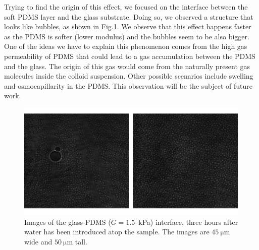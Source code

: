 Trying to find the origin of this effect, we focused on the interface between the soft PDMS layer and the glass substrate. Doing so, we observed a structure that looks like bubbles, as shown in Fig.\ref{fig.bubbles}. We observe that this effect happens faster as the PDMS is softer (lower modulus) and the bubbles seem to be also bigger. One of the ideas we have to explain this phenomenon comes from the high gas permeability of PDMS that could lead to a gas accumulation between the PDMS and the glass. The origin of this gas would come from the naturally present gas molecules inside the colloid suspension. Other possible scenarios include swelling and osmocapillarity in the PDMS. This observation will be the subject of future work. 


\begin{figure}[h]
	\centering
	\includegraphics{02_body/chapter4/images/ageing/bullbles_1p5kpa_3hours.pdf}
	\caption{Images of the glass-PDMS ($G=1.5$~kPa) interface, three hours after water has been introduced atop the sample. The images are $45~\mathrm{\mu m}$ wide and $50~\mathrm{\mu m}$ tall.}
	\label{fig.bubbles}
\end{figure}
